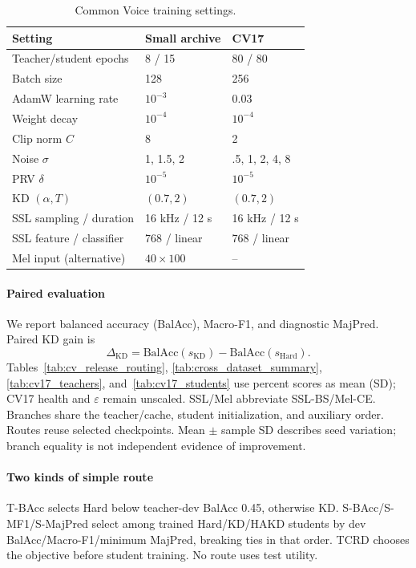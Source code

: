 \begin{table}[t]
\centering\scriptsize\setlength{\tabcolsep}{3pt}
\caption{Common Voice training settings.}
\label{tab:app_default_hyperparams}
\begin{tabular}{lll}\toprule
Setting & Small archive & CV17\\\midrule
Teacher/student epochs & 8 / 15 & 80 / 80\\
Batch size & 128 & 256\\
AdamW learning rate & $10^{-3}$ & 0.03\\
Weight decay & $10^{-4}$ & $10^{-4}$\\
Clip norm $C$ & 8 & 2\\
Noise $\sigma$ & 1, 1.5, 2 & .5, 1, 2, 4, 8\\
PRV $\delta$ & $10^{-5}$ & $10^{-5}$\\
KD $(\alpha,T)$ & $(0.7,2)$ & $(0.7,2)$\\
SSL sampling / duration & 16 kHz / 12 s & 16 kHz / 12 s\\
SSL feature / classifier & 768 / linear & 768 / linear\\
Mel input (alternative) & $40\times100$ & --\\\bottomrule
\end{tabular}
\end{table}

\paragraph*{Paired evaluation}
We report balanced accuracy (BalAcc), Macro-F1, and diagnostic MajPred. Paired KD gain is
\begin{equation}
\Delta_{\mathrm{KD}}=\mathrm{BalAcc}(s_{\mathrm{KD}})-\mathrm{BalAcc}(s_{\mathrm{Hard}}).
\label{eq:kd_gain}
\end{equation}
Tables~\ref{tab:cv_release_routing}, \ref{tab:cross_dataset_summary}, \ref{tab:cv17_teachers}, and~\ref{tab:cv17_students} use percent scores as mean (SD); CV17 health and $\varepsilon$ remain unscaled. SSL/Mel abbreviate SSL-BS/Mel-CE. Branches share the teacher/cache, student initialization, and auxiliary order. Routes reuse selected checkpoints. Mean $\pm$ sample SD describes seed variation; branch equality is not independent evidence of improvement.

\paragraph*{Two kinds of simple route}
T-BAcc selects Hard below teacher-dev BalAcc 0.45, otherwise KD. S-BAcc/S-MF1/S-MajPred select among trained Hard/KD/HAKD students by dev BalAcc/Macro-F1/minimum MajPred, breaking ties in that order. TCRD chooses the objective before student training. No route uses test utility.

